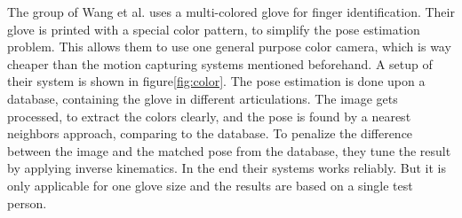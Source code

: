 The group of Wang et al. uses a multi-colored glove for finger identification. Their glove is printed with a special color pattern, to simplify the pose estimation problem. This allows them to use one general purpose color camera, which is way cheaper than the motion capturing systems mentioned beforehand. A setup of their system is shown in figure\ref{fig:color}. The pose estimation is done upon a database, containing the glove in different articulations. The image gets processed, to extract the colors clearly, and the pose is found by a nearest neighbors approach, comparing to the database. To penalize the difference between the image and the matched pose from the database, they tune the result by applying inverse kinematics. In the end their systems works reliably. But it is only applicable for one glove size and the results are based on a single test person.\\

